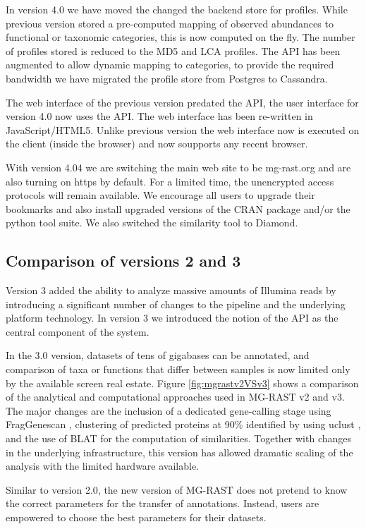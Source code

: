 \documentclass[12pt,fullpage]{report}
\begin{document}
In version 4.0 we have moved the changed the backend store for profiles. While previous version stored a pre-computed mapping of observed abundances to functional or taxonomic categories, this is now computed on the fly. The number of profiles stored is reduced to the MD5 and LCA profiles. The API has been augmented to allow dynamic mapping to categories, to provide the required bandwidth we have migrated the profile store from Postgres to Cassandra.

The web interface of the previous version predated the API, the user interface for version 4.0 now uses the API. The web interface has been re-written in JavaScript/HTML5. Unlike previous version the web interface now is executed on the client (inside the browser) and now soupports any recent browser.

With version 4.04 we are switching the main web site to be mg-rast.org and are also turning on https by default. For a limited time, the unencrypted access protocols will remain available. We encourage all users to upgrade their bookmarks and also install upgraded versions of the CRAN package and/or the python tool suite. We also switched the similarity tool to Diamond\cite{DIAMOND}.

\subsection*{Comparison of versions 2 and 3}
Version 3 added the ability to analyze massive amounts of Illumina reads by introducing a significant number of changes to the pipeline and the underlying platform technology. In version 3 we introduced the notion of the API as the central component of the system.

In the 3.0 version, datasets of tens of gigabases can be annotated, and comparison of taxa or functions that differ between samples is now limited only by the available screen real estate. Figure \ref{fig:mgrastv2VSv3} shows a comparison of the analytical and computational approaches used in MG-RAST v2 and v3. The major changes are the inclusion of a dedicated gene-calling stage using FragGenescan \cite{FGS}, clustering of predicted proteins at 90\% identified by using uclust \cite{UCLUST}, and the use of BLAT \cite{BLAT} for the computation of similarities. Together with changes in the underlying infrastructure, this version has allowed dramatic scaling of the analysis with the limited hardware available.

Similar to version 2.0, the new version of MG-RAST does not pretend to know the correct parameters for the transfer of annotations. Instead, users are empowered to choose the best parameters for their datasets.
\end{document}
